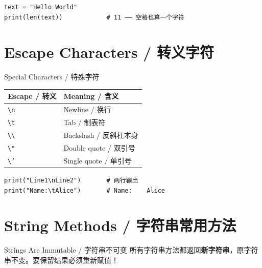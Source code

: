 \documentclass[11pt,a4paper]{report}
\let\oldtexttt\texttt
\renewcommand{\texttt}[1]{\textcolor{mainblue}{\oldtexttt{#1}}}
\begin{document}
\begin{lstlisting}
text = "Hello World"
print(len(text))            # 11 —— 空格也算一个字符
\end{lstlisting}

\section{Escape Characters / 转义字符}

\begin{concept}{Special Characters / 特殊字符}
\medskip
\renewcommand{\arraystretch}{1.5}
\begin{tabular}{@{}ll@{}}
\toprule
\textbf{Escape / 转义} & \textbf{Meaning / 含义} \\ \midrule
\texttt{\textbackslash n} & Newline / 换行 \\
\texttt{\textbackslash t} & Tab / 制表符 \\
\texttt{\textbackslash\textbackslash} & Backslash / 反斜杠本身 \\
\texttt{\textbackslash"} & Double quote / 双引号 \\
\texttt{\textbackslash'} & Single quote / 单引号 \\ \bottomrule
\end{tabular}
\medskip
\begin{lstlisting}
print("Line1\nLine2")       # 两行输出
print("Name:\tAlice")       # Name:    Alice
\end{lstlisting}
\end{concept}

\section{String Methods / 字符串常用方法}

\begin{concept}{Strings Are Immutable / 字符串不可变}
所有字符串方法都返回\textbf{新字符串}，原字符串不变。要保留结果必须重新赋值！
\end{concept}
\end{document}
